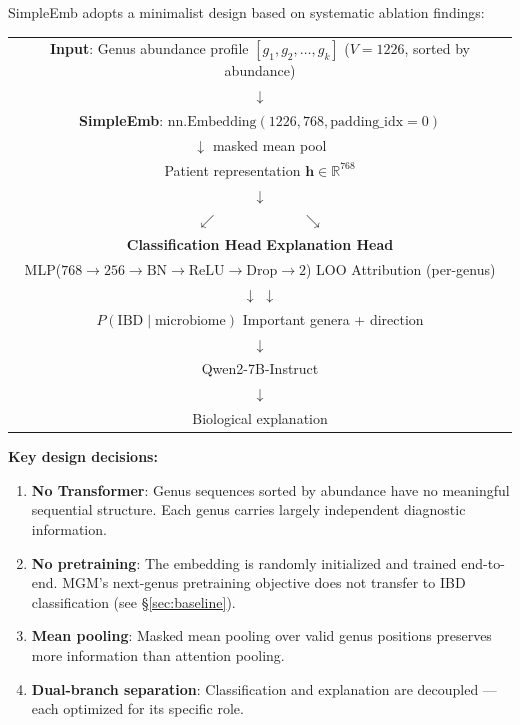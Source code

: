 \documentclass{article} %
\begin{document}
SimpleEmb adopts a minimalist design based on systematic ablation findings:

\begin{center}
\begin{tabular}{c}
\textbf{Input}: Genus abundance profile $[g_1, g_2, \ldots, g_k]$ ($V{=}1226$, sorted by abundance) \\
$\downarrow$ \\
\textbf{SimpleEmb}: $\text{nn.Embedding}(1226, 768, \text{padding\_idx}{=}0)$ \\
$\downarrow$ masked mean pool \\
Patient representation $\mathbf{h} \in \mathbb{R}^{768}$ \\
$\downarrow$ \\
$\swarrow \qquad \qquad \qquad \searrow$ \\
\textbf{Classification Head} \hspace{2cm} \textbf{Explanation Head} \\
MLP($768{\rightarrow}256{\rightarrow}\text{BN}{\rightarrow}\text{ReLU}{\rightarrow}\text{Drop}{\rightarrow}2$) \quad LOO Attribution (per-genus) \\
$\downarrow$ \hspace{3.5cm} $\downarrow$ \\
$P(\text{IBD} \mid \text{microbiome})$ \hspace{2.3cm} Important genera + direction \\
\hspace{4.3cm} $\downarrow$ \\
\hspace{3.3cm} Qwen2-7B-Instruct \\
\hspace{3.3cm} $\downarrow$ \\
\hspace{2.3cm} Biological explanation
\end{tabular}
\end{center}

\textbf{Key design decisions:}
\begin{enumerate}
  \item \textbf{No Transformer}: Genus sequences sorted by abundance have no meaningful sequential structure. Each genus carries largely independent diagnostic information.
  \item \textbf{No pretraining}: The embedding is randomly initialized and trained end-to-end. MGM's next-genus pretraining objective does not transfer to IBD classification (see \S\ref{sec:baseline}).
  \item \textbf{Mean pooling}: Masked mean pooling over valid genus positions preserves more information than attention pooling.
  \item \textbf{Dual-branch separation}: Classification and explanation are decoupled --- each optimized for its specific role.
\end{enumerate}
\end{document}
